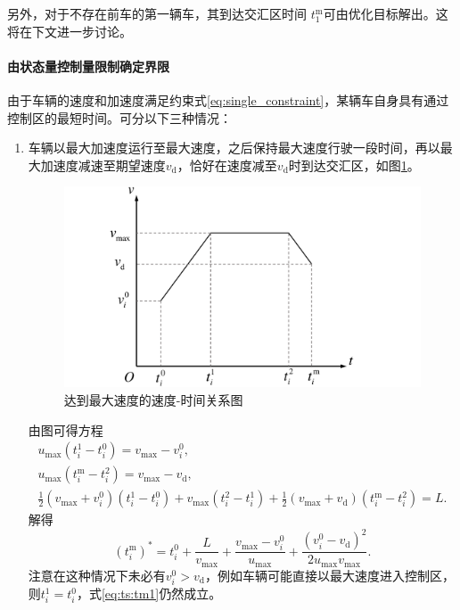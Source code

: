 另外，对于不存在前车的第一辆车，其到达交汇区时间 $t_1^\mathrm{m}$可由优化目标解出。这将在下文进一步讨论。

\paragraph{由状态量控制量限制确定界限}
由于车辆的速度和加速度满足约束式\ref{eq:single_constraint}，某辆车自身具有通过控制区的最短时间。可分以下三种情况：
\begin{enumerate}[label=(\arabic*)]
\item 车辆以最大加速度运行至最大速度，之后保持最大速度行驶一段时间，再以最大加速度减速至期望速度$v_\mathrm{d}$，恰好在速度减至$v_\mathrm{d}$时到达交汇区，如图\ref{fig:vmax}。
\begin{figure}[htbp]
\centering
\includegraphics[width=12cm]{figures/vmax.pdf}
\caption{达到最大速度的速度-时间关系图}
\label{fig:vmax}
\end{figure}

由图可得方程
\begin{gather}
u_{\max}(t_i^1-t_i^0)=v_{\max}-v_i^0,\\
u_{\max}(t_i^\mathrm{m}-t_i^2)=v_{\max}-v_\mathrm{d},\\
\frac12(v_{\max}+v_i^0)(t_i^1-t_i^0) + v_{\max}(t_i^2-t_i^1) + \frac12(v_{\max}+v_\mathrm{d})(t_i^\mathrm{m}-t_i^2) = L.
\end{gather}
解得
\begin{equation}
(t_i^\mathrm{m})^* = t_i^0 + \frac{L}{v_{\max}} + \frac{v_{\max}-v_i^0}{u_{\max}} + \frac{(v_i^0-v_\mathrm{d})^2}{2u_{\max}v_{\max}}.
\label{eq:ts:tm1}
\end{equation}
注意在这种情况下未必有$v_i^0 > v_\mathrm{d}$，例如车辆可能直接以最大速度进入控制区，则$t_i^1=t_i^0$，式\ref{eq:ts:tm1}仍然成立。


\end{enumerate}
